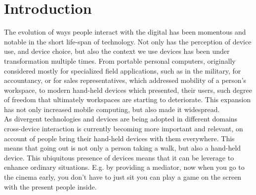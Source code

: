 \section{Introduction}

The evolution of ways people interact with the digital has been momentous and notable in the short life-span of technology. Not only has the perception of device use, and device choice, but also the context we use devices has been under transformation multiple times. From portable personal computers, originally considered mostly for specialized field applications, such as in the military, for accountancy, or for sales representatives, which addressed mobility of a person's workspace, to modern hand-held devices which presented, their users, such degree of freedom that ultimately workspaces are starting to deteriorate. This expansion has not only increased mobile computing, but also made it widespread. \\

As divergent technologies and devices are being adopted in different domains cross-device interaction is currently becoming more important and relevant, on account of people bring their hand-held devices with them everywhere. This means that going out is not only a person taking a walk, but also a hand-held device. This ubiquitous presence of devices means that it can be leverage to enhance ordinary situations. E.g. by providing a mediator, now when you go to the cinema early, you don't have to just sit you can play a game on the screen with the present people inside.\\

